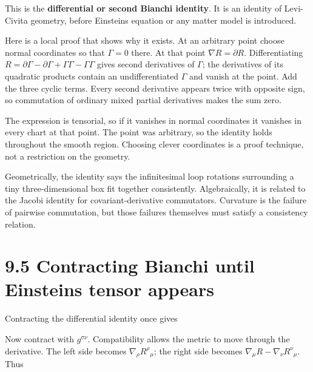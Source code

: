 \documentclass[
  11pt,
  letterpaper,
  oneside,
  openany]{scrbook}
\begin{document}
This is the \textbf{differential or second Bianchi identity}. It is an
identity of Levi-Civita geometry, before Einstein\textquotesingle s
equation or any matter model is introduced.

Here is a local proof that shows why it exists. At an arbitrary point
choose normal coordinates so that \(\Gamma=0\) there. At that point
\(\nabla R=\partial R\). Differentiating
\(R=\partial\Gamma-\partial\Gamma+\Gamma\Gamma-\Gamma\Gamma\) gives
second derivatives of \(\Gamma\); the derivatives of its quadratic
products contain an undifferentiated \(\Gamma\) and vanish at the point.
Add the three cyclic terms. Every second derivative appears twice with
opposite sign, so commutation of ordinary mixed partial derivatives
makes the sum zero.

The expression is tensorial, so if it vanishes in normal coordinates it
vanishes in every chart at that point. The point was arbitrary, so the
identity holds throughout the smooth region. Choosing clever coordinates
is a proof technique, not a restriction on the geometry.

Geometrically, the identity says the infinitesimal loop rotations
surrounding a tiny three-dimensional box fit together consistently.
Algebraically, it is related to the Jacobi identity for
covariant-derivative commutators. Curvature is the failure of pairwise
commutation, but those failures themselves must satisfy a consistency
relation.

\hypertarget{contracting-bianchi-until-einsteins-tensor-appears}{%
\section{9.5 Contracting Bianchi until Einstein\textquotesingle s tensor
appears}\label{contracting-bianchi-until-einsteins-tensor-appears}}

Contracting the differential identity once gives

\begin{center}
\begingroup
{}
\ifdim\wd\grmathbox>\linewidth
\resizebox{\linewidth}{!}{\usebox{\grmathbox}}
\else\usebox{\grmathbox}\fi
\endgroup
\end{center}

Now contract with \(g^{\sigma\nu}\). Compatibility allows the metric to
move through the derivative. The left side becomes
\(\nabla_\rho R^\rho{}_{\mu}\); the right side becomes
\(\nabla_\mu R-\nabla_\nu R^\nu{}_{\mu}\). Thus
\end{document}
